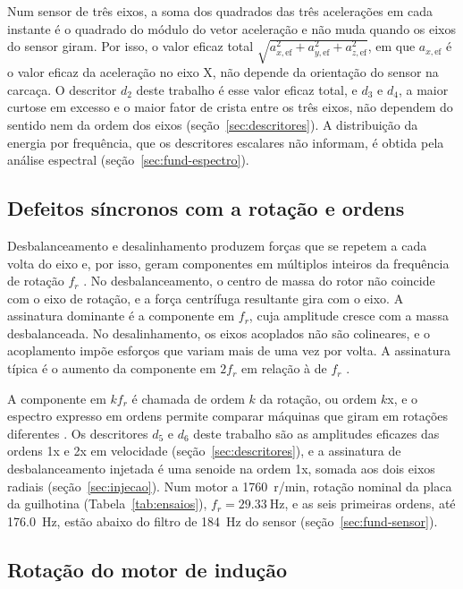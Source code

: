 Num sensor de três eixos, a soma dos quadrados das três acelerações em cada instante é o quadrado do módulo do vetor aceleração e não muda quando os eixos do sensor giram. Por isso, o valor eficaz total $\sqrt{a_{x,\mathrm{ef}}^2 + a_{y,\mathrm{ef}}^2 + a_{z,\mathrm{ef}}^2}$, em que $a_{x,\mathrm{ef}}$ é o valor eficaz da aceleração no eixo X, não depende da orientação do sensor na carcaça. O descritor $d_2$ deste trabalho é esse valor eficaz total, e $d_3$ e $d_4$, a maior curtose em excesso e o maior fator de crista entre os três eixos, não dependem do sentido nem da ordem dos eixos (seção~\ref{sec:descritores}). A distribuição da energia por frequência, que os descritores escalares não informam, é obtida pela análise espectral (seção~\ref{sec:fund-espectro}).

\subsection{Defeitos síncronos com a rotação e ordens}\label{sec:fund-ordens}

Desbalanceamento e desalinhamento produzem forças que se repetem a cada volta do eixo e, por isso, geram componentes em múltiplos inteiros da frequência de rotação $f_r$ \cite{randall2011livro}. No desbalanceamento, o centro de massa do rotor não coincide com o eixo de rotação, e a força centrífuga resultante gira com o eixo. A assinatura dominante é a componente em $f_r$, cuja amplitude cresce com a massa desbalanceada. No desalinhamento, os eixos acoplados não são colineares, e o acoplamento impõe esforços que variam mais de uma vez por volta. A assinatura típica é o aumento da componente em $2 f_r$ em relação à de $f_r$ \cite{randall2011livro}.

A componente em $k f_r$ é chamada de ordem $k$ da rotação, ou ordem $k$x, e o espectro expresso em ordens permite comparar máquinas que giram em rotações diferentes \cite{randall2011livro}. Os descritores $d_5$ e $d_6$ deste trabalho são as amplitudes eficazes das ordens 1x e 2x em velocidade (seção~\ref{sec:descritores}), e a assinatura de desbalanceamento injetada é uma senoide na ordem 1x, somada aos dois eixos radiais (seção~\ref{sec:injecao}). Num motor a \SI{1760}{r/min}, rotação nominal da placa da guilhotina (Tabela~\ref{tab:ensaios}), $f_r = \SI{29,33}{\hertz}$, e as seis primeiras ordens, até \SI{176,0}{\hertz}, estão abaixo do filtro de \SI{184}{\hertz} do sensor (seção~\ref{sec:fund-sensor}).

\subsection{Rotação do motor de indução}\label{sec:fund-motor}

